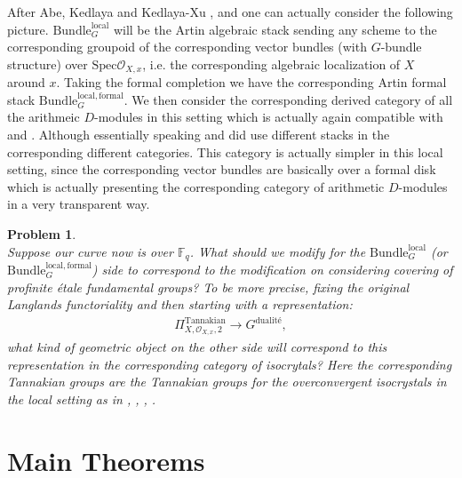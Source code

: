 \documentclass[12pt]{book}
\newtheorem{problem}{Problem}
\theoremstyle{definition}
\begin{document}
\indent After Abe, Kedlaya and Kedlaya-Xu \cite{AI}, \cite{KI} and \cite{KXII} one can actually consider the following picture. $\mathrm{Bundle}^\mathrm{local}_G$ will be the Artin algebraic stack sending any scheme to the corresponding groupoid of the corresponding vector bundles (with $G$-bundle structure) over $\mathrm{Spec}\mathcal{O}_{X,x}$, i.e. the corresponding algebraic localization of $X$ around $x$. Taking the formal completion we have the corresponding Artin formal stack $\mathrm{Bundle}^\mathrm{local,formal}_G$. We then consider the corresponding derived category of all the arithmeic $D$-modules in this setting which is actually again compatible with \cite{FS} and \cite{GL}. Although essentially speaking \cite{FS} and \cite{GL} did use different stacks in the corresponding different categories. This category is actually simpler in this local setting, since the corresponding vector bundles are basically over a formal disk which is actually presenting the corresponding category of arithmetic $D$-modules in a very transparent way.



\begin{problem}\mbox{}\\
Suppose our curve now is over $\mathbb{F}_q$. What should we modify for the $\mathrm{Bundle}^\mathrm{local}_G$ (or $\mathrm{Bundle}^\mathrm{local,formal}_G$) side to correspond to the modification on considering covering of profinite \'etale fundamental groups? To be more precise, fixing the original Langlands functoriality and then starting with a representation:
\begin{align}
\Pi^\mathrm{Tannakian}_{X,\mathcal{O}_{X,x},2} \rightarrow G^\text{dualit\'e},
\end{align}
what kind of geometric object on the other side will correspond to this representation in the corresponding category of isocrytals? Here the corresponding Tannakian groups are the Tannakian groups for the overconvergent isocrystals in the local setting as in \cite{AI}, \cite{KI}, \cite{KXII}, \cite{DK}.
\end{problem}








\newpage
\section{Main Theorems}
\end{document}
